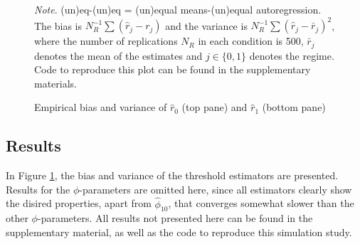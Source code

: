 \documentclass{article}
\begin{document}
\begin{figure}
\caption{Empirical bias and variance of $\hat{r}_0$ (top pane) and $\hat{r}_1$ (bottom pane)}
\begin{center}
\end{center}
\bigskip
\textit{Note}. (un)eq-(un)eq = (un)equal means-(un)equal autoregression. The bias is $N_R^{-1} \sum (\hat{r}_j - r_j)$ and the variance is $N_R^{-1} \sum (\hat{r}_j - \bar{r}_j)^2$, where the number of replications $N_R$ in each condition is 500, $\bar{r}_j$ denotes the mean of the estimates and $j \in \{0, 1\}$ denotes the regime. Code to reproduce this plot can be found in the supplementary materials.
\label{fig:simulation_study_2_results}
\end{figure}

\subsection{Results}
In Figure \ref{fig:simulation_study_2_results}, the bias and variance of the threshold estimators are presented.
Results for the $\phi$-parameters are omitted here, since all estimators clearly show the disired properties, apart from $\hat{\phi}_{10}$, that converges somewhat slower than the other $\phi$-parameters. 
All results not presented here can be found in the supplementary material, as well as the code to reproduce this simulation study.
\end{document}

